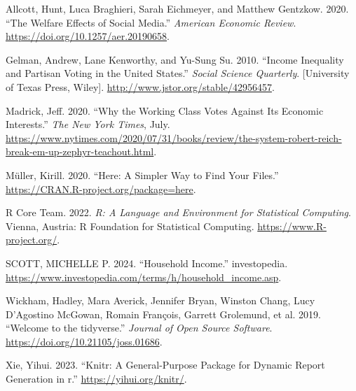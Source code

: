 \documentclass[
  letterpaper,
  DIV=11,
  numbers=noendperiod]{scrartcl}
\newlength{\cslhangindent}
\newenvironment{CSLReferences}[2] %
 {\begin{list}{}{%
  \setlength{\itemindent}{0pt}
  \setlength{\leftmargin}{0pt}
  \setlength{\parsep}{0pt}
  \ifodd #1
   \setlength{\leftmargin}{\cslhangindent}
   \setlength{\itemindent}{-1\cslhangindent}
  \fi
  \setlength{\itemsep}{#2\baselineskip}}}
 {\end{list}}
\begin{document}
\label{refs}
\begin{CSLReferences}{1}{0}
Allcott, Hunt, Luca Braghieri, Sarah Eichmeyer, and Matthew Gentzkow.
2020. {``The Welfare Effects of Social Media.''} \emph{American Economic
Review}. \url{https://doi.org/10.1257/aer.20190658}.

Gelman, Andrew, Lane Kenworthy, and Yu-Sung Su. 2010. {``Income
Inequality and Partisan Voting in the United States.''} \emph{Social
Science Quarterly}. {[}University of Texas Press, Wiley{]}.
\url{http://www.jstor.org/stable/42956457}.

Madrick, Jeff. 2020. {``Why the Working Class Votes Against Its Economic
Interests.''} \emph{The New York Times}, July.
\url{https://www.nytimes.com/2020/07/31/books/review/the-system-robert-reich-break-em-up-zephyr-teachout.html}.

Müller, Kirill. 2020. {``Here: A Simpler Way to Find Your Files.''}
\url{https://CRAN.R-project.org/package=here}.

R Core Team. 2022. \emph{R: A Language and Environment for Statistical
Computing}. Vienna, Austria: R Foundation for Statistical Computing.
\url{https://www.R-project.org/}.

SCOTT, MICHELLE P. 2024. {``Household Income.''} investopedia.
\url{https://www.investopedia.com/terms/h/household_income.asp}.

Wickham, Hadley, Mara Averick, Jennifer Bryan, Winston Chang, Lucy
D'Agostino McGowan, Romain François, Garrett Grolemund, et al. 2019.
{``Welcome to the {tidyverse}.''} \emph{Journal of Open Source
Software}. \url{https://doi.org/10.21105/joss.01686}.

Xie, Yihui. 2023. {``Knitr: A General-Purpose Package for Dynamic Report
Generation in r.''} \url{https://yihui.org/knitr/}.

\end{CSLReferences}
\end{document}
